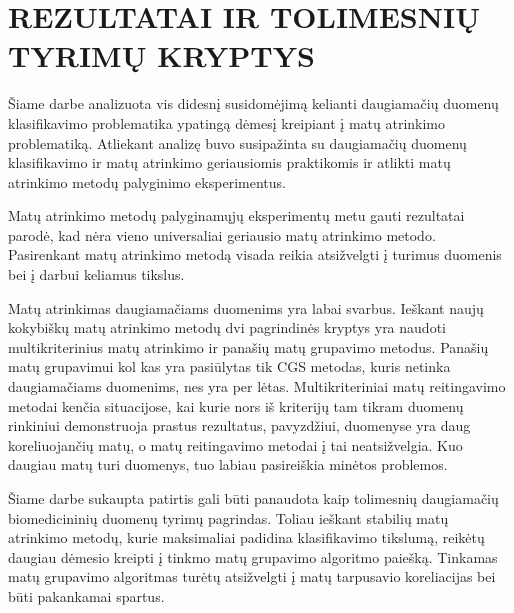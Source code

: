 
\section*{REZULTATAI IR TOLIMESNIŲ TYRIMŲ KRYPTYS}
\label{rezultatai_ir_tolimesniu_tyrimu_kryptys}

Šiame darbe analizuota vis didesnį susidomėjimą kelianti daugiamačių duomenų klasifikavimo problematika ypatingą dėmesį kreipiant į matų atrinkimo problematiką. Atliekant analizę buvo susipažinta su daugiamačių duomenų klasifikavimo ir matų atrinkimo geriausiomis praktikomis ir atlikti matų atrinkimo metodų palyginimo eksperimentus.

Matų atrinkimo metodų palyginamųjų eksperimentų metu gauti rezultatai parodė, kad nėra vieno universaliai geriausio matų atrinkimo metodo. Pasirenkant matų atrinkimo metodą visada reikia atsižvelgti į turimus duomenis bei į darbui keliamus tikslus. 

Matų atrinkimas daugiamačiams duomenims yra labai svarbus. Ieškant naujų kokybiškų matų atrinkimo metodų dvi pagrindinės kryptys yra naudoti multikriterinius matų atrinkimo ir panašių matų grupavimo metodus. Panašių matų grupavimui kol kas yra pasiūlytas tik CGS metodas, kuris netinka daugiamačiams duomenims, nes yra per lėtas. Multikriteriniai matų reitingavimo metodai kenčia situacijose, kai kurie nors iš kriterijų tam tikram duomenų rinkiniui demonstruoja prastus rezultatus, pavyzdžiui, duomenyse yra daug koreliuojančių matų, o matų reitingavimo metodai į tai neatsižvelgia. Kuo daugiau matų turi duomenys, tuo labiau pasireiškia minėtos problemos.

Šiame darbe sukaupta patirtis gali būti panaudota kaip tolimesnių daugiamačių biomedicininių duomenų tyrimų pagrindas. Toliau ieškant stabilių matų atrinkimo metodų, kurie maksimaliai padidina klasifikavimo tikslumą, reikėtų daugiau dėmesio kreipti į tinkmo matų grupavimo algoritmo paiešką. Tinkamas matų grupavimo algoritmas turėtų atsižvelgti į matų tarpusavio koreliacijas bei būti pakankamai spartus.
